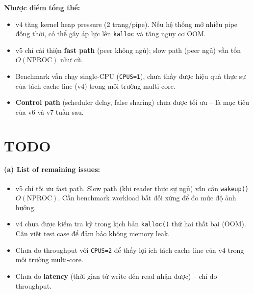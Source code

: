 \documentclass[11pt,a4paper]{article}
\begin{document}
\textbf{Nhược điểm tổng thể:}
\begin{itemize}
  \item v4 tăng kernel heap pressure (2 trang/pipe). Nếu hệ thống mở nhiều pipe đồng thời, có thể gây áp lực lên \texttt{kalloc} và tăng nguy cơ OOM.
  \item v5 chỉ cải thiện \textbf{fast path} (peer không ngủ); slow path (peer ngủ) vẫn tốn $O(\text{NPROC})$ như cũ.
  \item Benchmark vẫn chạy single-CPU (\texttt{CPUS=1}), chưa thấy được hiệu quả thực sự của tách cache line (v4) trong môi trường multi-core.
  \item \textbf{Control path} (scheduler delay, false sharing) chưa được tối ưu -- là mục tiêu của v6 và v7 tuần sau.
\end{itemize}

\section{TODO}

\paragraph{(a) List of remaining issues:}
\begin{itemize}
  \item v5 chỉ tối ưu fast path. Slow path (khi reader thực sự ngủ) vẫn cần \texttt{wakeup()} $O(\text{NPROC})$. Cần benchmark workload bất đối xứng để đo mức độ ảnh hưởng.
  \item v4 chưa được kiểm tra kỹ trong kịch bản \texttt{kalloc()} thứ hai thất bại (OOM). Cần viết test case để đảm bảo không memory leak.
  \item Chưa đo throughput với \texttt{CPUS=2} để thấy lợi ích tách cache line của v4 trong môi trường multi-core.
  \item Chưa đo \textbf{latency} (thời gian từ write đến read nhận được) -- chỉ đo throughput.
\end{itemize}
\end{document}
